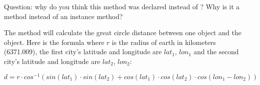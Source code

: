 \begin{exercise}
Question: why do you think this method was declared  instead of ? Why is it a  method instead of an instance method?

The  method will calculate the great circle distance between one  object and the   object. Here is the formula where $r$ is the radius of earth in kilometers (6371.009), the first city's latitude and longitude are $lat_1$, $lon_1$ and the second city's latitude and longitude are  $lat_2$, $lon_2$:

\begin{equation*}
d = r\cdot cos^{-1}(sin(lat_1)\cdot sin(lat_2) + cos(lat_1)\cdot cos(lat_2)\cdot cos(lon_1 - lon_2))
\end{equation*}


\end{exercise}
